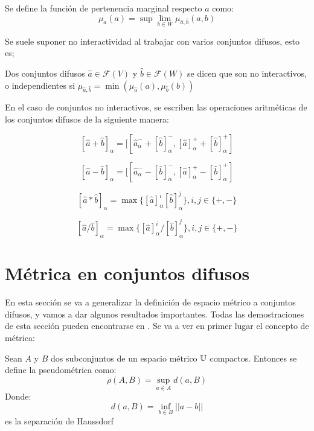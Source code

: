   \begin{definicion}
    Se define la función de pertenencia marginal respecto $a$ como:
    \[
    \mu_a(a) = \sup\lim\limits_{b \in W} \mu_{\hat{a}, \hat{b}} (a, b)
    \]
  \end{definicion}

  Se suele suponer no interactividad al trabajar con varios conjuntos difusos, esto es;

  \begin{definicion}
    Dos conjuntos difusos $\hat{a} \in \mathcal{F}(V)$ y $\hat{b} \in \mathcal{F}(W)$ se dicen que son no interactivos, o independientes si $\mu_{\hat{a}, \hat{b}} = \min(\mu_{\hat{a}}(a), \mu_{\hat{b}}(b))$
  \end{definicion}

  \begin{ejemplo}
    En el caso de conjuntos no interactivos, se escriben las operaciones aritméticas de los conjuntos difusos de la siguiente manera:

    \[
      [\hat{a} + \hat{b}]_\alpha = [[\hat{a}^-_\alpha + [\hat{b}]_\alpha^-, [\hat{a}]^+_\alpha + [\hat{b}]_\alpha^+]
        \]

        \[
          [\hat{a} - \hat{b}]_\alpha = [[\hat{a}^-_\alpha - [\hat{b}]_\alpha^-, [\hat{a}]^+_\alpha - [\hat{b}]_\alpha^+]
            \]

            \[
              [\hat{a} * \hat{b}]_\alpha = \max\{ [\hat{a}]_\alpha^i [\hat{b}]^j_\alpha \}, i, j \in \{+, -\}
              \]

              \[
                [\hat{a} / \hat{b}]_\alpha = \max\{ [\hat{a}]_\alpha^i / [\hat{b}]^j_\alpha \}, i, j \in \{+, -\}
                \]
  \end{ejemplo}

  \section{Métrica en conjuntos difusos}
  En esta sección se va a generalizar la definición de espacio métrico a conjuntos difusos, y vamos a dar algunos resultados importantes. Todas las demostraciones de esta sección pueden encontrarse en \cite{apuntesfuzzy}. Se va a ver en primer lugar el concepto de métrica:

  \begin{definicion}[Pseudométrica]
    Sean $A$ y $B$ dos subconjuntos de un espacio métrico $\mathbb U$ compactos. Entonces se define la pseudométrica como:
    \[
    \rho(A, B) = \sup\limits_{a \in A} d(a, B)
    \]
    Donde:
    \[
    d(a, B) = \inf\limits_{b \in B} ||a-b||
    \]
    es la separación de Haussdorf
  \end{definicion}


